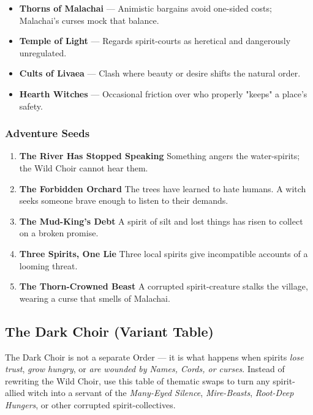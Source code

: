 \documentclass[11pt]{book}
\begin{document}
    \begin{itemize}[leftmargin=1.5em]
      \item \textbf{Thorns of Malachai} --- Animistic bargains avoid one-sided costs; Malachai's curses mock that balance.
      \item \textbf{Temple of Light} --- Regards spirit-courts as heretical and dangerously unregulated.
      \item \textbf{Cults of Livaea} --- Clash where beauty or desire shifts the natural order.
      \item \textbf{Hearth Witches} --- Occasional friction over who properly "keeps" a place's safety.
    \end{itemize}
    
    \subsubsection*{Adventure Seeds}
    
    \begin{enumerate}[leftmargin=1.5em]
      \item \textbf{The River Has Stopped Speaking}  
      Something angers the water-spirits; the Wild Choir cannot hear them.
    
      \item \textbf{The Forbidden Orchard}  
      The trees have learned to hate humans.  
      A witch seeks someone brave enough to listen to their demands.
    
      \item \textbf{The Mud-King's Debt}  
      A spirit of silt and lost things has risen to collect on a broken promise.
    
      \item \textbf{Three Spirits, One Lie}  
      Three local spirits give incompatible accounts of a looming threat.
    
      \item \textbf{The Thorn-Crowned Beast}  
      A corrupted spirit-creature stalks the village, wearing a curse that smells of Malachai.
    \end{enumerate}


    \subsection*{The Dark Choir (Variant Table)}
    \label{order:darkchoir}
    
    The Dark Choir is not a separate Order --- it is what happens when spirits  
    \emph{lose trust}, \emph{grow hungry}, or \emph{are wounded by Names, Cords, or curses}.  
    Instead of rewriting the Wild Choir, use this table of thematic swaps to turn any  
    spirit-allied witch into a servant of the \emph{Many-Eyed Silence}, \emph{Mire-Beasts},  
    \emph{Root-Deep Hungers}, or other corrupted spirit-collectives.
    
\end{document}
